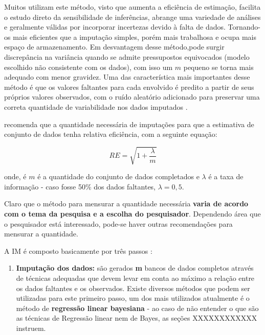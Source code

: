 \documentclass[
]{book}
\providecommand{\tightlist}{%
  \setlength{\itemsep}{0pt}\setlength{\parskip}{0pt}}
\begin{document}
Muitos utilizam este método, visto que aumenta a eficiência de estimação, facilita o estudo direto da sensibilidade de inferências, abrange uma variedade de análises e geralmente válidas por incorporar incertezas devido à falta de dados. Tornando-os mais eficientes que a imputação simples, porém mais trabalhosa e ocupa mais espaço de armazenamento. Em desvantagem desse método,pode surgir discrepância na variância quando se admite pressupostos equivocados (modelo escolhido não consistente com os dados), com isso um \(m\) pequeno se torna mais adequado com menor gravidez. Uma das característica mais importantes desse método é que os valores faltantes para cada envolvido é predito a partir de seus próprios valores observados, com o ruído aleatório adicionado para preservar uma correta quantidade de variabilidade nos dados imputados \citep{schafer2002missing}.

\citet{schafer1999multiple} recomenda que a quantidade necessária de imputações para que a estimativa de conjunto de dados tenha relativa eficiência, com a seguinte equação:

\begin{equation} 
  RE=\sqrt{1+\frac{\lambda}{m}}
  \label{eq:qimputm}
\end{equation}

onde, é \(m\) é a quantidade do conjunto de dados completados e \(\lambda\) é a taxa de informação - caso fosse 50\% dos dados faltantes, \(\lambda=0,5\).

Claro que o método para mensurar a quantidade necessária \textbf{varia de acordo com o tema da pesquisa e a escolha do pesquisador}. Dependendo área que o pesquisador está interessado, pode-se haver outras recomendações para mensurar a quantidade.

A IM é composto basicamente por três passos \citep{assunccao2012estrategias}:

\begin{enumerate}
\def\labelenumi{\arabic{enumi}.}
\tightlist
\item
  \textbf{Imputação dos dados:} são gerados \textbf{m} bancos de dados completos através de técnicas adequadas que devem levar em conta ao máximo a relação entre os dados faltantes e os observados. Existe diversos métodos que podem ser utilizadas para este primeiro passo, um dos mais utilizados atualmente é o método de \textbf{regressão linear bayesiana} - ao caso de não entender o que são as técnicas de Regressão linear nem de Bayes, as seções XXXXXXXXXXXX instruem.
\end{enumerate}
\end{document}
